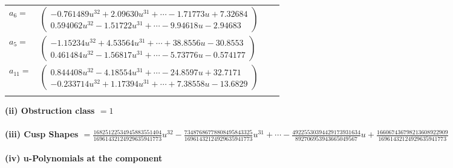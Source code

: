 \documentclass[1p]{elsarticle_modified}
\theoremstyle{definition}
\begin{document}
\begin{tabular}{m{7pt} m{180pt} m{7pt} m{180pt} }
\flushright $a_{6}=$&$\begin{pmatrix}-0.761489 u^{32}+2.09630 u^{31}+\cdots-1.71773 u+7.32684\\0.594062 u^{32}-1.51722 u^{31}+\cdots-9.94618 u-2.94683\end{pmatrix}$ \\
\flushright $a_{5}=$&$\begin{pmatrix}-1.15234 u^{32}+4.53564 u^{31}+\cdots+38.8556 u-30.8553\\0.461484 u^{32}-1.56817 u^{31}+\cdots-5.73776 u-0.574177\end{pmatrix}$ \\
\flushright $a_{11}=$&$\begin{pmatrix}0.844408 u^{32}-4.18554 u^{31}+\cdots-24.8597 u+32.7171\\-0.233714 u^{32}+1.17394 u^{31}+\cdots+7.38558 u-13.6829\end{pmatrix}$\\&\end{tabular}
\flushleft \textbf{(ii) Obstruction class $= 1$}\\~\\
\flushleft \textbf{(iii) Cusp Shapes $= \frac{16825122534945883551404}{16961432124929635941773} u^{32}-\frac{73487686778808495843325}{16961432124929635941773} u^{31}+\cdots-\frac{49225530394429173931634}{892706953943665049567} u+\frac{166067436798213608922909}{16961432124929635941773}$}\\~\\
\newpage\renewcommand{\arraystretch}{1}
\flushleft \textbf{(iv) u-Polynomials at the component}\newline \\
\end{document}
